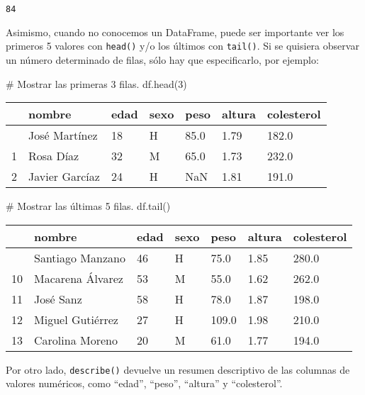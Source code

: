 \documentclass[
  letterpaper,
  DIV=11,
  numbers=noendperiod]{scrreprt}
\newenvironment{Shaded}{\begin{snugshade}}{\end{snugshade}}
\newcommand{\CommentTok}[1]{\textcolor[rgb]{0.37,0.37,0.37}{#1}}
\newcommand{\DecValTok}[1]{\textcolor[rgb]{0.68,0.00,0.00}{#1}}
\newcommand{\NormalTok}[1]{\textcolor[rgb]{0.00,0.23,0.31}{#1}}
\begin{document}
\begin{verbatim}
84
\end{verbatim}

Asimismo, cuando no conocemos un DataFrame, puede ser importante ver los
primeros 5 valores con \texttt{head()} y/o los últimos con
\texttt{tail()}. Si se quisiera observar un número determinado de filas,
sólo hay que especificarlo, por ejemplo:

\begin{Shaded}
\begin{Highlighting}[]
\CommentTok{\# Mostrar las primeras 3 filas.}
\NormalTok{df.head(}\DecValTok{3}\NormalTok{)}
\end{Highlighting}
\end{Shaded}

\begin{longtable}[]{@{}lllllll@{}}
\toprule\noalign{}
& nombre & edad & sexo & peso & altura & colesterol \\
\midrule\noalign{}
\endhead
\bottomrule\noalign{}
\endlastfoot
0 & José Martínez & 18 & H & 85.0 & 1.79 & 182.0 \\
1 & Rosa Díaz & 32 & M & 65.0 & 1.73 & 232.0 \\
2 & Javier Garcíaz & 24 & H & NaN & 1.81 & 191.0 \\
\end{longtable}

\begin{Shaded}
\begin{Highlighting}[]
\CommentTok{\# Mostrar las últimas 5 filas.}
\NormalTok{df.tail()}
\end{Highlighting}
\end{Shaded}

\begin{longtable}[]{@{}lllllll@{}}
\toprule\noalign{}
& nombre & edad & sexo & peso & altura & colesterol \\
\midrule\noalign{}
\endhead
\bottomrule\noalign{}
\endlastfoot
9 & Santiago Manzano & 46 & H & 75.0 & 1.85 & 280.0 \\
10 & Macarena Álvarez & 53 & M & 55.0 & 1.62 & 262.0 \\
11 & José Sanz & 58 & H & 78.0 & 1.87 & 198.0 \\
12 & Miguel Gutiérrez & 27 & H & 109.0 & 1.98 & 210.0 \\
13 & Carolina Moreno & 20 & M & 61.0 & 1.77 & 194.0 \\
\end{longtable}

Por otro lado, \texttt{describe()} devuelve un resumen descriptivo de
las columnas de valores numéricos, como ``edad'', ``peso'', ``altura'' y
``colesterol''.
\end{document}
